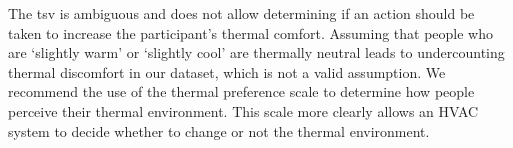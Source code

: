 The \ac{tsv} is ambiguous and does not allow determining if an action should be taken to increase the participant's thermal comfort.
Assuming that people who are `slightly warm' or `slightly cool' are thermally neutral leads to undercounting thermal discomfort in our dataset, which is not a valid assumption.
We recommend the use of the thermal preference scale to determine how people perceive their thermal environment. 
This scale more clearly allows an HVAC system to decide whether to change or not the thermal environment.

